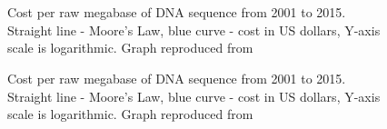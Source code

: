 \appendix
\chapter[Appendix]{}
\vspace*{-0.3in}
\begin{figure}[hb!]
\begin{center}
\end{center}
\caption[Cost per raw megabase of DNA sequence from 2001 to 2015]{Cost per raw megabase of DNA sequence from 2001 to 2015. Straight line - Moore's Law, blue curve - cost in US dollars, Y-axis scale is logarithmic. Graph reproduced from \citep{wetterstrand2016}}
\end{figure}
\begin{figure}[hb!]
\begin{center}
\end{center}
\caption[Cost per raw megabase of DNA sequence from 2001 to 2015]{Cost per raw megabase of DNA sequence from 2001 to 2015. Straight line - Moore's Law, blue curve - cost in US dollars, Y-axis scale is logarithmic. Graph reproduced from \citep{wetterstrand2016}}
\end{figure}

